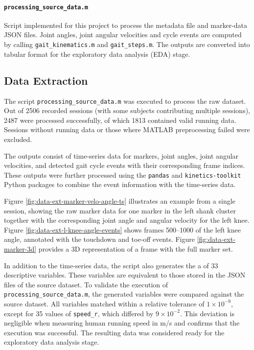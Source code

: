 \paragraph{\texttt{processing\_source\_data.m}}
Script implemented for this project to process the metadata file and marker-data JSON files. Joint angles, joint angular velocities and cycle events are computed by calling \texttt{gait\_kinematics.m} and \texttt{gait\_steps.m}. The outputs are converted into tabular format for the exploratory data analysis (EDA) stage.


\subsection{Data Extraction}\label{subsec:data-extraction}

The script \texttt{processing\_source\_data.m} was executed to process the raw dataset. Out of 2506 recorded sessions (with some subjects contributing multiple sessions), 2487 were processed successfully, of which 1813 contained valid running data. Sessions without running data or those where MATLAB preprocessing failed were excluded.

The outputs consist of time-series data for markers, joint angles, joint angular velocities, and detected gait cycle events with their corresponding frame indices. These outputs were further processed using the \texttt{pandas} and \texttt{kinetics-toolkit} Python packages to combine the event information with the time-series data.

Figure \ref{fig:data-ext-marker-velo-angle-ts} illustrates an example from a single session, showing the raw marker data for one marker in the left shank cluster together with the corresponding joint angle and angular velocity for the left knee. Figure \ref{fig:data-ext-l-knee-angle-events} shows frames 500--1000 of the left knee angle, annotated with the touchdown and toe-off events. Figure \ref{fig:data-ext-marker-3d} provides a 3D representation of a frame with the full marker set.

In addition to the time-series data, the script also generates the a of 33 descriptive variables. These variables are equivalent to those stored in the JSON files of the source dataset. To validate the execution of \texttt{processing\_source\_data.m}, the generated variables were compared against the source dataset. All variables matched within a relative tolerance of $1 \times 10^{-9}$, except for 35 values of \texttt{speed\_r}, which differed by $9 \times 10^{-2}$. This deviation is negligible when measuring human running speed in m/s and confirms that the execution was successful. The resulting data was considered ready for the exploratory data analysis stage.

